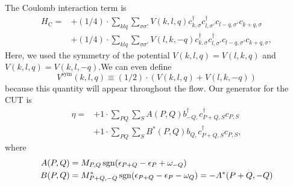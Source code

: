 The Coulomb interaction term is
\begin{align*}
	H_\mathrm{C} = 	&+(1/4) \cdot \sum_{ k l q } \sum_{ \sigma \sigma' } V( k, l, q )   c_{ k, \sigma }^\dagger  c_{ l, \sigma' }^\dagger  c_{ l-q, \sigma' } c_{ k+q, \sigma }  \\
	&+(1/4) \cdot \sum_{ k l q } \sum_{ \sigma \sigma' } V( l, k, -q )   c_{ k, \sigma }^\dagger  c_{ l, \sigma' }^\dagger  c_{ l-q, \sigma' } c_{ k+q, \sigma } 
,
\end{align*}
Here, we used the symmetry of the potential $V(k, l, q) = V(l, k, q)$ and $V(k, l, q) = V(k, l, -q)$.We can even define
\begin{equation}
	V^\mathrm{sym} (k, l, q) \equiv (1/2) \cdot (V(k, l, q) + V(l, k, -q))
\end{equation}
because this quantity will appear throughout the flow.
Our generator for the CUT is 
\begin{align*}
	\eta = 	&+1 \cdot \sum_{ P Q } \sum_{ S } A( P, Q )   b_{ -Q, }^\dagger  c_{ P+Q, S }^\dagger  c_{ P, S }  \\
	&+1 \cdot \sum_{ P Q } \sum_{ S } B^*( P, Q )   b_{ Q, } c_{ P+Q, S }^\dagger  c_{ P, S } 
, \end{align*}
where
\begin{align}
	A(P,Q) &= M_{P,Q} \operatorname{sgn} ( \epsilon_{P+Q} - \epsilon_P + \omega_{-Q} ) \\
	B(P,Q) &= M_{P+Q,-Q}^* \operatorname{sgn} ( \epsilon_{P+Q} - \epsilon_P - \omega_Q ) = - A^* (P+Q, -Q)
\end{align}

